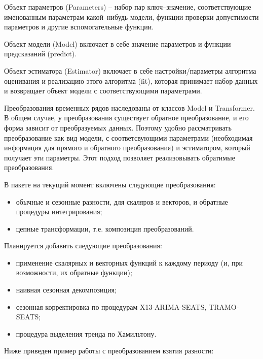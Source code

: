 \documentclass[a4paper,14pt]{extreport}
\begin{document}
	Объект параметров (Parameters) – набор пар ключ–значение, соответствующие именованным параметрам какой–нибудь модели, функции проверки допустимости параметров и другие вспомогательные функции.
	
	Объект модели (Model) включает в себе значение параметров и функции предсказаний (predict).
	
	Объект эстиматора (Estimator) включает в себе настройки/параметры алгоритма оценивания и реализацию этого алгоритма (fit), которая принимает набор данных и возвращает объект модели с соответствующими параметрами.
	
	
	Преобразования временных рядов наследованы от классов Model и Transformer. В общем случае, у преобразования существует обратное преобразование, и его форма зависит от преобразуемых данных. Поэтому удобно рассматривать преобразование как вид модели, с соответсвующими параметрами (необходимая информация для прямого и обратного преобразования) и эстиматором, который получает эти параметры. Этот подход позволяет реализовывать обратимые преобразования.
	
	В пакете на текущий момент включены следующие преобразования:
	\begin{itemize}
		\item обычные и сезонные разности, для скаляров и векторов, и обратные процедуры интегрирования;
		\item цепные трансформации, т.е. композиция преобразований.
	\end{itemize}
	
	Планируется добавить следующие преобразования:
	\begin{itemize}
		\item применение скалярных и векторных функций к каждому периоду (и, при возможности, их обратные функции);
		\item наивная сезонная декомпозиция;
		\item сезонная корректировка по процедурам X13-ARIMA-SEATS, TRAMO-SEATS;
		\item процедура выделения тренда по Хамильтону.
	\end{itemize}
	
	Ниже приведен пример работы с преобразованием взятия разности:
	
\end{document}
